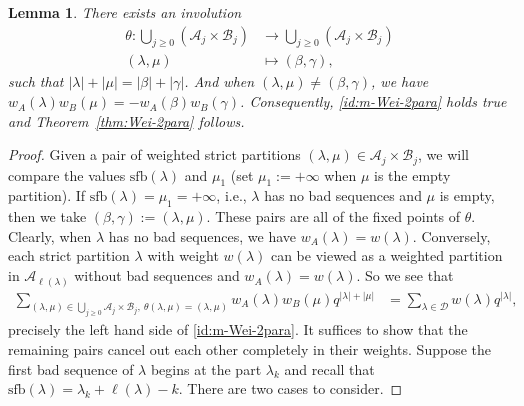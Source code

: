 \documentclass[11pt,reqno]{amsart}
\numberwithin{equation}{section}
\theoremstyle{plain}
\newtheorem{lemma}[theorem]{Lemma}
\theoremstyle{definition}
\newcommand{\abs}[1]{\left|#1\right|}
\def\A{\mathcal{A}}
\def\la{\lambda}
\def\sfb{\mathrm{sfb}}
\def\gam{\gamma}
\newcommand{\B}{\mathcal{B}}
\newcommand{\D}{\mathcal{D}}
\begin{document}
\begin{lemma}
There exists an involution 
\begin{align*}
\theta: \bigcup_{j\ge 0}(\A_{j}\times \B_j) &\to \bigcup_{j\ge 0}(\A_{j}\times \B_j)\\
(\la, \mu) &\mapsto (\beta, \gam),
\end{align*}
such that $|\la|+|\mu|=|\beta|+|\gam|$. And when $(\la,\mu)\neq(\beta,\gam)$, we have $w_A(\la)w_B(\mu)=-w_A(\beta)w_B(\gam)$. Consequently, \eqref{id:m-Wei-2para} holds true and Theorem~\ref{thm:Wei-2para} follows.
\end{lemma}

\begin{proof}
Given a pair of weighted strict partitions $(\la, \mu)\in \A_{j}\times \B_j$, we will compare the values $\sfb(\la)$ and $\mu_1$ (set $\mu_1:=+\infty$ when $\mu$ is the empty partition). If $\sfb(\la)=\mu_1=+\infty$, i.e., $\la$ has no bad sequences and $\mu$ is empty, then we take $(\beta,\gam):=(\la,\mu)$. These pairs are all of the fixed points of $\theta$. Clearly, when $\la$ has no bad sequences, we have $w_A(\la)=w(\la)$. Conversely, each strict partition $\la$ with weight $w(\la)$ can be viewed as a weighted partition in $\A_{\ell(\la)}$ without bad sequences and $w_A(\la)=w(\la)$. So we see that
\begin{align*}
\sum_{(\la,\mu)\in\bigcup_{j\ge 0}\A_j\times\B_j,~\theta(\la,\mu)=(\la,\mu)}w_A(\la)w_B(\mu)q^{\abs{\la}+\abs{\mu}} &=\sum_{\la\in\D}w(\la)q^{\abs{\la}},
\end{align*}
precisely the left hand side of \eqref{id:m-Wei-2para}. It suffices to show that the remaining pairs cancel out each other completely in their weights. Suppose the first bad sequence of $\la$ begins at the part $\la_k$ and recall that $\sfb(\la)=\la_k+\ell(\la)-k$. There are two cases to consider.




\end{proof}
\end{document}
